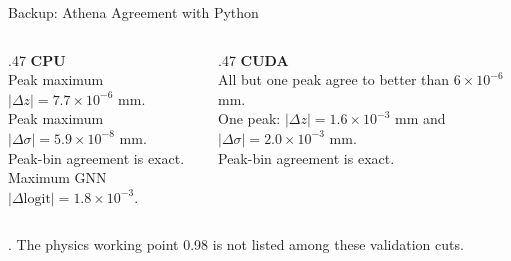 \begin{frame}{Backup: Athena Agreement with Python}
\begin{columns}[t]
\begin{column}{.47\linewidth}\small
\textbf{CPU}\\[.8em]
Peak maximum $|\Delta z|=7.7\times10^{-6}$ mm.\\[.6em]
Peak maximum $|\Delta\sigma|=5.9\times10^{-8}$ mm.\\[.6em]
Peak-bin agreement is exact.\\[.6em]
Maximum GNN $|\Delta\mathrm{logit}|=1.8\times10^{-3}$.
\end{column}
\begin{column}{.47\linewidth}\small
\textbf{CUDA}\\[.8em]
All but one peak agree to better than $6\times10^{-6}$ mm.\\[.6em]
One peak: $|\Delta z|=1.6\times10^{-3}$ mm and $|\Delta\sigma|=2.0\times10^{-3}$ mm.\\[.6em]
Peak-bin agreement is exact.
\end{column}
\end{columns}
{\scriptsize\color{black!55}\treysource. The physics working point 0.98 is not listed among these validation cuts.}
\end{frame}
